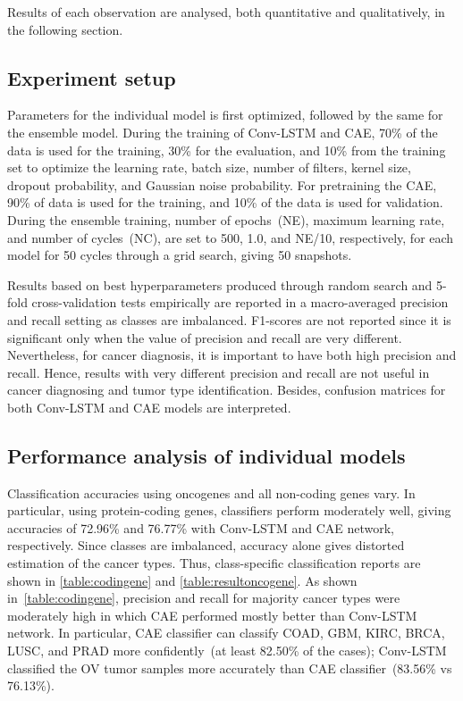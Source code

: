 \hspace*{3.5mm} Results of each observation are analysed, both quantitative and qualitatively, in the following section. 

\subsection{Experiment setup}
Parameters for the individual model is first optimized, followed by the same for the ensemble model. During the training of Conv-LSTM and CAE, 70\% of the data is used for the training, 30\% for the evaluation, and 10\% from the training set to optimize the learning rate, batch size, number of filters, kernel size, dropout probability, and Gaussian noise probability. For pretraining the CAE, 90\% of data is used for the training, and 10\% of the data is used for validation. 
During the ensemble training, number of epochs~(NE), maximum learning rate, and number of cycles~(NC), are set to 500, 1.0, and NE/10, respectively, for each model for 50 cycles through a grid search, giving 50 snapshots. 

\hspace*{3.5mm} Results based on best hyperparameters produced through random search and 5-fold cross-validation tests empirically are reported in a macro-averaged precision and recall setting as classes are imbalanced. F1-scores are not reported since it is significant only when the value of precision and recall are very different. Nevertheless, for cancer diagnosis, it is important to have both high precision and recall. Hence, results with very different precision and recall are not useful in cancer diagnosing and tumor type identification. Besides, confusion matrices for both Conv-LSTM and CAE models are interpreted. 

\subsection{Performance analysis of individual models}
Classification accuracies using oncogenes and all non-coding genes vary. In particular, using protein-coding genes, classifiers perform moderately well, giving accuracies of 72.96\% and 76.77\% with Conv-LSTM and CAE network, respectively. Since classes are imbalanced, accuracy alone gives distorted estimation of the cancer types. Thus, class-specific classification reports are shown in \cref{table:codingene} and \cref{table:resultoncogene}. As shown in~\cref{table:codingene}, precision and recall for majority cancer types were moderately high in which CAE performed mostly better than Conv-LSTM network. In particular, CAE classifier can classify COAD, GBM, KIRC, BRCA, LUSC, and PRAD more confidently~(at least 82.50\% of the cases); Conv-LSTM classified the OV tumor samples more accurately than CAE classifier~(83.56\% vs 76.13\%). 

